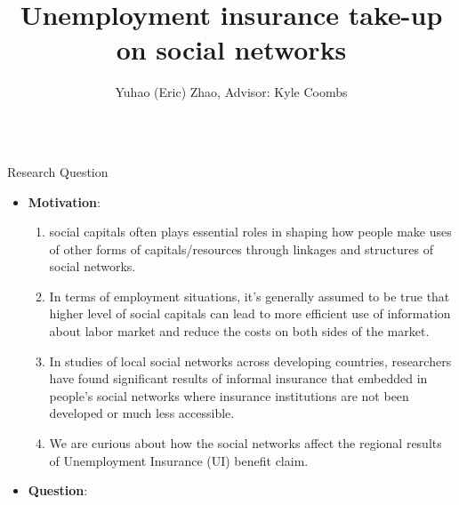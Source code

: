\documentclass[xcolor=dvipsnames]{beamer} %
\title{Unemployment insurance take-up on social networks}
\author{Yuhao (Eric) Zhao, Advisor: Kyle Coombs}
\institute{Economics Department, Bates College}
\begin{document}
\begin{frame}{} 


\begin{columns}[t]




  \begin{column}{.3\linewidth} 
  
  \begin{block}{\LARGE Research Question}
  \begin{itemize}
        \vspace{0.3in}
      \item {\textbf{Motivation}}:
        \vspace{0.3in}
      \begin{enumerate}
        
      
      \item social capitals often plays essential roles in shaping how people make uses of other forms of capitals/resources through linkages and structures of social networks. 
      
      \item In terms of employment situations, it's generally assumed to be true that higher level of social capitals can lead to more efficient use of information about labor market and reduce the costs on both sides of the market.
      
      \item In studies of local social networks across developing countries, researchers have found significant results of informal insurance that embedded in people's social networks where insurance institutions are not been developed or much less accessible.
      
      \item We are curious about how the social networks affect the regional results of Unemployment Insurance (UI) benefit claim.

      

      
      \end{enumerate}
      \vspace{0.3 in}
      
      \item {\textbf{Question}}:
      \vspace{0.3in}
      

\end{itemize}
\end{block}
\end{column}
\end{columns}
\end{frame}
\end{document}
